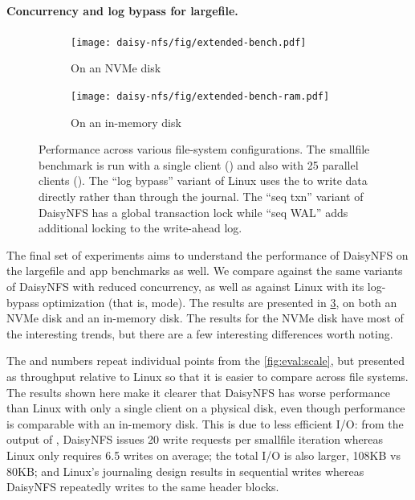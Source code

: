 \paragraph{Concurrency and log bypass for largefile.}

\begin{figure}[hp]
  \begin{subfigure}[b]{\textwidth}
    \texttt{[image: daisy-nfs/fig/extended-bench.pdf]}
    \caption{On an NVMe disk}
    \label{fig:bench-configs:nvme}
  \end{subfigure}

  \begin{subfigure}[b]{\textwidth}
    \texttt{[image: daisy-nfs/fig/extended-bench-ram.pdf]}
    \caption{On an in-memory disk}
    \label{fig:bench-configs:ram}
  \end{subfigure}
  \vspace{0.5\baselineskip}
  \caption[Benchmarks across file-system configurations]%
  {Performance across various file-system configurations. The smallfile
    benchmark is run with a single client () and also with 25
    parallel clients (). The ``log bypass'' variant of Linux
    uses the  to write data directly rather than through the
    journal. The ``seq txn'' variant of DaisyNFS has a global transaction lock
    while ``seq WAL'' adds additional locking to the write-ahead log.}
  \label{fig:bench-configs}
\end{figure}

The final set of experiments aims to understand the performance of DaisyNFS on
the largefile and app benchmarks as well. We compare against the same variants
of DaisyNFS with reduced concurrency, as well as against Linux with its
log-bypass optimization (that is,  mode).
The results are presented in \cref{fig:bench-configs},
on both an NVMe disk and an in-memory disk. The results for the NVMe disk have
most of the interesting trends, but there are a few interesting differences
worth noting.

The  and  numbers repeat individual points from
the \cref{fig:eval:scale}, but presented as throughput relative to Linux so that
it is easier to compare across file systems. The  results shown
here make it clearer that DaisyNFS has worse performance than Linux with
only a single client on a physical disk, even though performance is comparable
with an in-memory disk. This is due to less efficient I/O: from the output
of , DaisyNFS issues 20 write requests per smallfile iteration
whereas Linux only requires 6.5 writes on average; the total I/O is also larger,
108KB vs 80KB; and Linux's journaling design results in sequential writes
whereas DaisyNFS repeatedly writes to the same header blocks.

